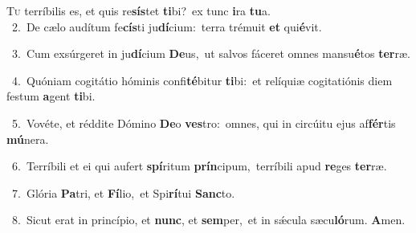 \lettrine{\initial\textcolor{\initialcolor}{T}}{u} terríbilis es, et quis re\-\textbf{sís}\-tet \textbf{ti}\-bi?~\star ex tunc \textbf{i}\-ra \textbf{tu}\-a.\\
{\numbfont\textcolor{\numbcolor}{~2.}}~De cælo audítum fe\-\textbf{cís}\-ti ju\-\textbf{dí}\-cium:~\star terra trémuit \textbf{et} qui\-\textbf{é}\-vit.\par
{\numbfont\textcolor{\numbcolor}{~3.}}~Cum exsúrgeret in ju\-\textbf{dí}\-cium \textbf{De}\-us,~\star ut salvos fáceret omnes mansu\-\textbf{é}\-tos \textbf{ter}\-ræ.\par
{\numbfont\textcolor{\numbcolor}{~4.}}~Quóniam cogitátio hóminis confi\-\textbf{té}\-bitur \textbf{ti}\-bi:~\star et relíquiæ cogitatiónis diem festum \textbf{a}\-gent \textbf{ti}\-bi.\par
{\numbfont\textcolor{\numbcolor}{~5.}}~Vovéte, et réddite Dómino \textbf{De}\-o \textbf{ves}\-tro:~\star omnes, qui in circúitu ejus af\-\textbf{fér}\-tis \textbf{mú}\-nera.\par
{\numbfont\textcolor{\numbcolor}{~6.}}~Terríbili et ei qui aufert \textbf{spí}\-ritum \textbf{prín}\-cipum,~\star terríbili apud \textbf{re}\-ges \textbf{ter}\-ræ.\par
{\numbfont\textcolor{\numbcolor}{~7.}}~Glória \textbf{Pa}\-tri, et \textbf{Fí}\-lio,~\star et Spi\-\textbf{rí}\-tui \textbf{Sanc}\-to.\par
{\numbfont\textcolor{\numbcolor}{~8.}}~Sicut erat in princípio, et \textbf{nunc}\-, et \textbf{sem}\-per,~\star et in sǽcula sæcu\-\textbf{ló}\-rum. \textbf{A}\-men.\par
